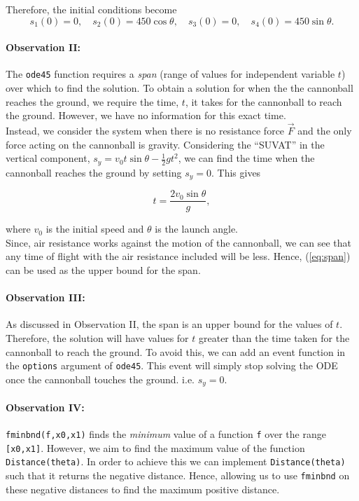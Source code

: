 \documentclass[11pt]{report}
\begin{document}
	Therefore, the initial conditions become 
	\begin{equation}
		s_1(0)=0, \quad s_2(0)=450\cos{\theta}, \quad s_3(0)=0, \quad s_4(0)=450\sin{\theta}.
		\label{eq:icode45}
	\end{equation}

\paragraph{Observation II:}
The \texttt{ode45} function requires a \emph{span} (range of values for independent variable $t$) over which to find the solution. To obtain a solution for when the the cannonball reaches the ground, we require the time, $t$, it takes for the cannonball to reach the ground. However, we have no information for this exact time. \\

Instead, we consider the system when there is no resistance force $\vec{F}$ and the only force acting on the cannonball is gravity. Considering the ``SUVAT'' in the vertical component, $s_y = v_0t\sin{\theta} - \frac{1}{2}gt^2$, we can find the time when the cannonball reaches the ground by setting $s_y=0$. This gives

\begin{equation}
	t=\frac{2v_0\sin{\theta}}{g},
	\label{eq:span}
\end{equation}

where $v_0$ is the initial speed and $\theta$ is the launch angle.\\

Since, air resistance works against the motion of the cannonball, we can see that any time of flight with the air resistance included will be less. Hence, (\ref{eq:span}) can be used as the upper bound for the span.

\paragraph{Observation III:}
As discussed in Observation II, the span is an upper bound for the values of $t$. Therefore, the solution will have values for $t$ greater than the time taken for the cannonball to reach the ground. To avoid this, we can add an event function in the \texttt{options} argument of \texttt{ode45}. This event will simply stop solving the ODE once the cannonball touches the ground. i.e. $s_y=0$.


\paragraph{Observation IV:}
\texttt{fminbnd(f,x0,x1)} finds the \emph{minimum} value of a function \texttt{f} over the range \texttt{[x0,x1]}. However, we aim to find the maximum value of the function \texttt{Distance(theta)}. In order to achieve this we can implement \texttt{Distance(theta)} such that it returns the negative distance. Hence, allowing us to use \texttt{fminbnd} on these negative distances to find the maximum positive distance.
\end{document}
